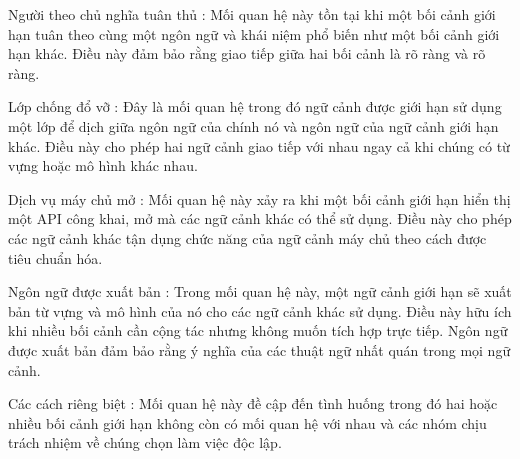 Người theo chủ nghĩa tuân thủ : Mối quan hệ này tồn tại khi một bối cảnh giới hạn tuân theo cùng một ngôn ngữ và khái niệm phổ biến như một bối cảnh giới hạn khác. Điều này đảm bảo rằng giao tiếp giữa hai bối cảnh là rõ ràng và rõ ràng.

Lớp chống đổ vỡ : Đây là mối quan hệ trong đó ngữ cảnh được giới hạn sử dụng một lớp để dịch giữa ngôn ngữ của chính nó và ngôn ngữ của ngữ cảnh giới hạn khác. Điều này cho phép hai ngữ cảnh giao tiếp với nhau ngay cả khi chúng có từ vựng hoặc mô hình khác nhau.

Dịch vụ máy chủ mở : Mối quan hệ này xảy ra khi một bối cảnh giới hạn hiển thị một API công khai, mở mà các ngữ cảnh khác có thể sử dụng. Điều này cho phép các ngữ cảnh khác tận dụng chức năng của ngữ cảnh máy chủ theo cách được tiêu chuẩn hóa.

Ngôn ngữ được xuất bản : Trong mối quan hệ này, một ngữ cảnh giới hạn sẽ xuất bản từ vựng và mô hình của nó cho các ngữ cảnh khác sử dụng. Điều này hữu ích khi nhiều bối cảnh cần cộng tác nhưng không muốn tích hợp trực tiếp. Ngôn ngữ được xuất bản đảm bảo rằng ý nghĩa của các thuật ngữ nhất quán trong mọi ngữ cảnh.

Các cách riêng biệt : Mối quan hệ này đề cập đến tình huống trong đó hai hoặc nhiều bối cảnh giới hạn không còn có mối quan hệ với nhau và các nhóm chịu trách nhiệm về chúng chọn làm việc độc lập.


